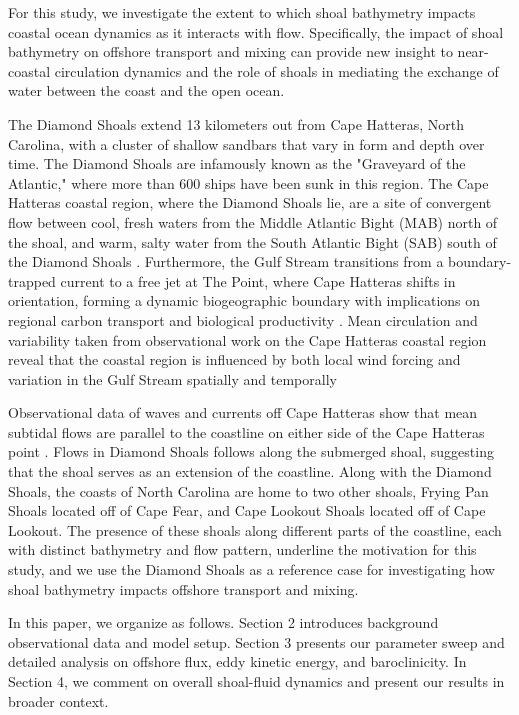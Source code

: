 For this study, we investigate the extent to which shoal bathymetry impacts coastal ocean dynamics as it interacts with flow. Specifically, the impact of shoal bathymetry on offshore transport and mixing can provide new insight to near-coastal circulation dynamics and the role of shoals in mediating the exchange of water between the coast and the open ocean. 

The Diamond Shoals extend 13 kilometers out from Cape Hatteras, North Carolina, with a cluster of shallow sandbars that vary in form and depth over time. The Diamond Shoals are infamously known as the "Graveyard of the Atlantic," where more than 600 ships have been sunk in this region. The Cape Hatteras coastal region, where the Diamond Shoals lie, are a site of convergent flow between cool, fresh waters from the Middle Atlantic Bight (MAB) north of the shoal, and warm, salty water from the South Atlantic Bight (SAB) south of the Diamond Shoals \cite{seim22}. Furthermore, the Gulf Stream transitions from a boundary-trapped current to a free jet at The Point, where Cape Hatteras shifts in orientation, forming a dynamic biogeographic boundary with implications on regional carbon transport and biological productivity \cite{lee91}. Mean circulation and variability taken from observational work on the Cape Hatteras coastal region reveal that the coastal region is influenced by both local wind forcing and variation in the Gulf Stream spatially and temporally \cite{han22}

Observational data of waves and currents off Cape Hatteras show that mean subtidal flows are parallel to the coastline on either side of the Cape Hatteras point \cite{kumar13}. Flows in Diamond Shoals follows along the submerged shoal, suggesting that the shoal serves as an extension of the coastline. Along with the Diamond Shoals, the coasts of North Carolina are home to two other shoals, Frying Pan Shoals located off of Cape Fear, and Cape Lookout Shoals located off of Cape Lookout. The presence of these shoals along different parts of the coastline, each with distinct bathymetry and flow pattern, underline the motivation for this study, and we use the Diamond Shoals as a reference case for investigating how shoal bathymetry impacts offshore transport and mixing. 

In this paper, we organize as follows. Section 2 introduces background observational data and model setup. Section 3 presents our parameter sweep and detailed analysis on offshore flux, eddy kinetic energy, and baroclinicity. In Section 4, we comment on overall shoal-fluid dynamics and present our results in broader context. 


